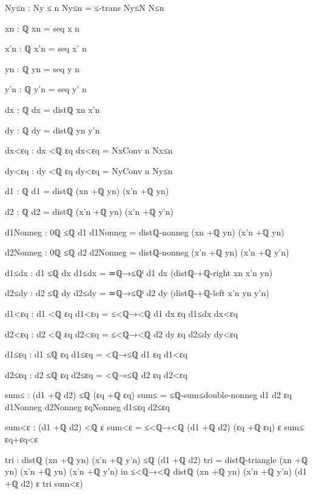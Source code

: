 \documentclass[11pt,a4paper]{book}
\begin{document}
\begin{code}
{          Ny≤n : Ny ≤ n
          Ny≤n = ≤-trans Ny≤N N≤n

          xn : ℚ
          xn = seq x n

          x'n : ℚ
          x'n = seq x' n

          yn : ℚ
          yn = seq y n

          y'n : ℚ
          y'n = seq y' n

          dx : ℚ
          dx = distℚ xn x'n

          dy : ℚ
          dy = distℚ yn y'n

          dx<εq : dx <ℚ εq
          dx<εq = NxConv n Nx≤n

          dy<εq : dy <ℚ εq
          dy<εq = NyConv n Ny≤n

          d1 : ℚ
          d1 = distℚ (xn +ℚ yn) (x'n +ℚ yn)

          d2 : ℚ
          d2 = distℚ (x'n +ℚ yn) (x'n +ℚ y'n)

          d1Nonneg : 0ℚ ≤ℚ d1
          d1Nonneg = distℚ-nonneg (xn +ℚ yn) (x'n +ℚ yn)

          d2Nonneg : 0ℚ ≤ℚ d2
          d2Nonneg = distℚ-nonneg (x'n +ℚ yn) (x'n +ℚ y'n)

          d1≤dx : d1 ≤ℚ dx
          d1≤dx = ≃ℚ→≤ℚˡ {d1} {dx} (distℚ-+ℚ-right xn x'n yn)

          d2≤dy : d2 ≤ℚ dy
          d2≤dy = ≃ℚ→≤ℚˡ {d2} {dy} (distℚ-+ℚ-left x'n yn y'n)

          d1<εq : d1 <ℚ εq
          d1<εq = ≤<ℚ→<ℚ {d1} {dx} {εq} d1≤dx dx<εq

          d2<εq : d2 <ℚ εq
          d2<εq = ≤<ℚ→<ℚ {d2} {dy} {εq} d2≤dy dy<εq

          d1≤εq : d1 ≤ℚ εq
          d1≤εq = <ℚ→≤ℚ {d1} {εq} d1<εq

          d2≤εq : d2 ≤ℚ εq
          d2≤εq = <ℚ→≤ℚ {d2} {εq} d2<εq

          sum≤ : (d1 +ℚ d2) ≤ℚ (εq +ℚ εq)
          sum≤ = ≤ℚ-sum≤double-nonneg d1 d2 εq d1Nonneg d2Nonneg εqNonneg d1≤εq d2≤εq

          sum<ε : (d1 +ℚ d2) <ℚ ε
          sum<ε = ≤<ℚ→<ℚ {(d1 +ℚ d2)} {(εq +ℚ εq)} {ε} sum≤ εq+εq<ε

          tri : distℚ (xn +ℚ yn) (x'n +ℚ y'n) ≤ℚ (d1 +ℚ d2)
          tri = distℚ-triangle (xn +ℚ yn) (x'n +ℚ yn) (x'n +ℚ y'n)
        in
        ≤<ℚ→<ℚ {distℚ (xn +ℚ yn) (x'n +ℚ y'n)} {(d1 +ℚ d2)} {ε} tri sum<ε)
  }
\end{code}
\end{document}
